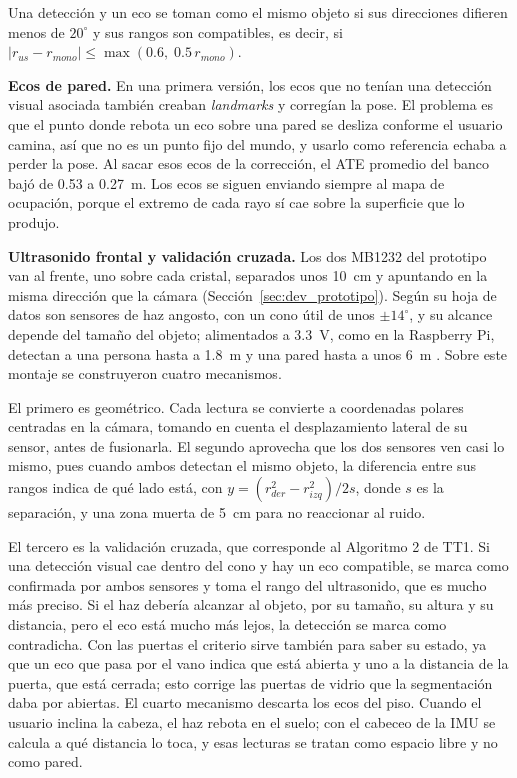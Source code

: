 Una detección y un eco se toman como el mismo objeto si sus direcciones difieren menos
de $20^\circ$ y sus rangos son compatibles, es decir, si
$|r_{us} - r_{mono}| \leq \max(0.6,\; 0.5\, r_{mono})$.

\textbf{Ecos de pared.} En una primera versión, los ecos que no tenían una detección
visual asociada también creaban \emph{landmarks} y corregían la pose. El problema es que
el punto donde rebota un eco sobre una pared se desliza conforme el usuario camina, así
que no es un punto fijo del mundo, y usarlo como referencia echaba a perder la pose. Al
sacar esos ecos de la corrección, el ATE promedio del banco bajó de 0.53 a 0.27~m. Los
ecos se siguen enviando siempre al mapa de ocupación, porque el extremo de cada rayo sí
cae sobre la superficie que lo produjo.

\textbf{Ultrasonido frontal y validación cruzada.} Los dos MB1232 del prototipo van al
frente, uno sobre cada cristal, separados unos 10~cm y apuntando en la misma dirección
que la cámara (Sección~\ref{sec:dev_prototipo}). Según su hoja de datos son sensores de
haz angosto, con un cono útil de unos $\pm 14^\circ$, y su alcance depende del tamaño
del objeto; alimentados a 3.3~V, como en la Raspberry Pi, detectan a una persona hasta a
1.8~m y una pared hasta a unos 6~m \cite{mb1232_datasheet}. Sobre este montaje se
construyeron cuatro mecanismos.

El primero es geométrico. Cada lectura se convierte a coordenadas polares centradas en
la cámara, tomando en cuenta el desplazamiento lateral de su sensor, antes de
fusionarla. El segundo aprovecha que los dos sensores ven casi lo mismo, pues cuando
ambos detectan el mismo objeto, la diferencia entre sus rangos indica de qué lado está,
con $y = (r_{der}^2 - r_{izq}^2)/2s$, donde $s$ es la separación, y una zona muerta de
5~cm para no reaccionar al ruido.

El tercero es la validación cruzada, que corresponde al Algoritmo 2 de TT1. Si una
detección visual cae dentro del cono y hay un eco compatible, se marca como confirmada
por ambos sensores y toma el rango del ultrasonido, que es mucho más preciso. Si el haz
debería alcanzar al objeto, por su tamaño, su altura y su distancia, pero el eco está
mucho más lejos, la detección se marca como contradicha. Con las puertas el criterio
sirve también para saber su estado, ya que un eco que pasa por el vano indica que está
abierta y uno a la distancia de la puerta, que está cerrada; esto corrige las puertas de
vidrio que la segmentación daba por abiertas. El cuarto mecanismo descarta los ecos del
piso. Cuando el usuario inclina la cabeza, el haz rebota en el suelo; con el cabeceo de
la IMU se calcula a qué distancia lo toca, y esas lecturas se tratan como espacio libre
y no como pared.

